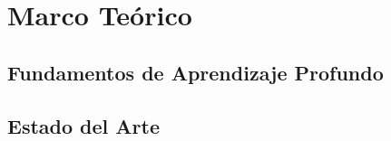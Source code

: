 \chapter{Marco Teórico}\label{ch:marco_teorico}

\section{Fundamentos de Aprendizaje Profundo}\label{sec:fundamentos_de_aprendizaje_profundo}

\section{Estado del Arte}\label{sec:estado_del_arte}
